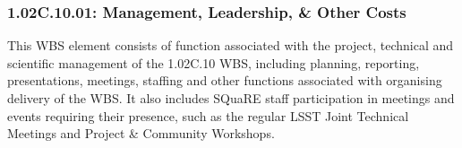 \subsubsection*{1.02C.10.01: Management, Leadership, \& Other Costs}

This WBS element consists of function associated with the project, technical
and scientific management of the 1.02C.10 WBS, including planning, reporting,
presentations, meetings, staffing and other functions associated with
organising delivery of the WBS. It also includes SQuaRE staff participation in
meetings and events requiring their presence, such as the regular LSST Joint
Technical Meetings and Project \& Community Workshops.
